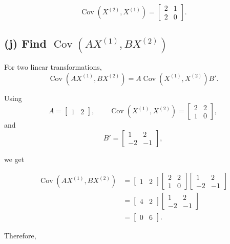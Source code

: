 \documentclass[12pt]{article}
\begin{document}
	\[
	\operatorname{Cov}(X^{(2)},X^{(1)})
	=
	\begin{bmatrix}
		2&1\\
		2&0
	\end{bmatrix}.
	\]
	
	\subsection*{(j) Find $\operatorname{Cov}(AX^{(1)},BX^{(2)})$}
	
	For two linear transformations,
	\[
	\boxed{
		\operatorname{Cov}(AX^{(1)},BX^{(2)})
		=
		A\operatorname{Cov}(X^{(1)},X^{(2)})B'
	}.
	\]
	
	Using
	\[
	A=
	\begin{bmatrix}
		1&2
	\end{bmatrix},
	\qquad
	\operatorname{Cov}(X^{(1)},X^{(2)})
	=
	\begin{bmatrix}
		2&2\\
		1&0
	\end{bmatrix},
	\]
	and
	\[
	B'=
	\begin{bmatrix}
		1&2\\
		-2&-1
	\end{bmatrix},
	\]
	
	we get
	
	\[
	\begin{aligned}
		\operatorname{Cov}(AX^{(1)},BX^{(2)})
		&=
		\begin{bmatrix}
			1&2
		\end{bmatrix}
		\begin{bmatrix}
			2&2\\
			1&0
		\end{bmatrix}
		\begin{bmatrix}
			1&2\\
			-2&-1
		\end{bmatrix}\\
		&=
		\begin{bmatrix}
			4&2
		\end{bmatrix}
		\begin{bmatrix}
			1&2\\
			-2&-1
		\end{bmatrix}\\
		&=
		\begin{bmatrix}
			0&6
		\end{bmatrix}.
	\end{aligned}
	\]
	
	Therefore,
	
\end{document}
